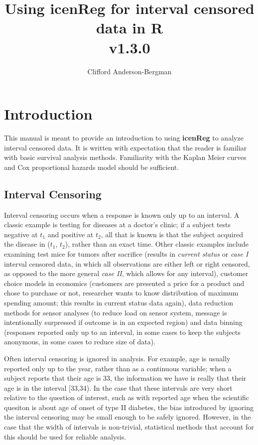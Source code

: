 \documentclass[11pt]{report}
\begin{document}


\title{Using {\bf{icenReg}} for interval censored data in {\bf{R} } \\ v1.3.0}
\author{Clifford Anderson-Bergman}
\maketitle


\tableofcontents

\chapter{Introduction}

  This manual is meant to provide an introduction to using {\bf icenReg} to 
  analyze interval censored data. It is written with expectation that the reader
  is familiar with basic survival analysis methods. Familiarity with the Kaplan 
  Meier curves and Cox proportional hazards model should be sufficient. 

  \section{Interval Censoring}

  Interval censoring occurs when a response is known only up to an interval. 
  A classic example is testing for diseases at a doctor's clinic; if a 
  subject tests negative at $t_1$ and positive at $t_2$, all that is known is
  that the subject acquired the disease in ($t_1$, $t_2$), rather than an exact time. 
  Other classic examples include examining test mice for tumors after sacrifice 
  (results in \emph{current status} or \emph{case I} interval censored data, in which
  all observations are either left or right censored, as opposed to the more general
  \emph{case II}, which allows for any interval),
  customer choice models in economics (customers are presented a price
  for a product and chose to purchase or not, researcher wants to know distribution of 
  maximum spending amount; this results in current status data again), 
  data reduction methods for sensor analyses (to reduce load on sensor system, message
  is intentionally surpressed if outcome is in an expected region) and data binning 
  (responses reported only up to an interval, in some cases to keep the subjects
  anonymous, in some cases to reduce size of data). 

  
  Often interval censoring is ignored in analysis. For example, age is usually reported only 
  up to the year, rather than as a continuous variable; when a subject reports that their age is 33,
  the information we have is really that their age is in the interval [33,34). 
  In the case that these intervals are very short relative to the question of interest,
  such as with reported age when the scientific quesiton is about age of onset
  of type II diabetes, 
  the bias introduced by ignoring the interval censoring may be 
  small enough to be safely ignored. However, in the case that the width of intervals is 
  non-trivial, statistical methods that account for this should be used for reliable analysis. 
  
\end{document}
